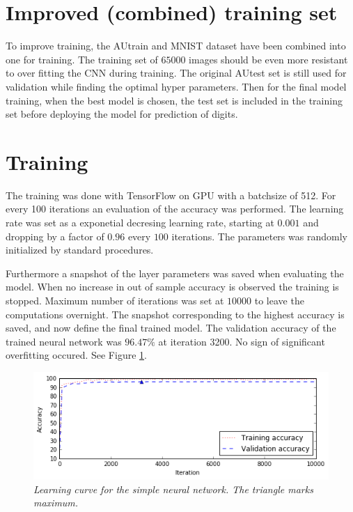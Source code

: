 \documentclass[a4paper,10pt,article,oneside,english]{memoir}
\let\oldcaption\caption
\renewcommand{\caption}[1]{\oldcaption{\emph{#1}}}
\begin{document}
	
	
	\section{Improved (combined) training set}
	To improve training, the AUtrain and MNIST dataset have been combined into one for training. The training set of $65000$ images should be even more resistant to over fitting the CNN during training. 
	The original AUtest set is still used for validation while finding the optimal hyper parameters. Then for the final model training, when the best model is chosen, the test set is included in the training set before deploying the model for prediction of digits.  
	
	
	\section{Training}
	The training was done with TensorFlow on GPU with a batchsize of 512. For every 100 iterations an evaluation of the accuracy was performed. 
	The learning rate was set as a exponetial decresing learning rate, starting at $0.001$ and dropping by a factor of $0.96$ every $100$ iterations. The parameters was randomly initialized by standard procedures.
	
	Furthermore a snapshot of the layer parameters was saved when evaluating the model. When no increase in out of sample accuracy is observed the training is stopped. Maximum number of iterations was set at $10000$ to leave the computations overnight. The snapshot corresponding to the highest accuracy is saved, and now define the final trained model. The validation accuracy of the trained neural network was $96.47\%$ at iteration 3200. No sign of significant overfitting occured. See Figure \ref{fig:nn_learning}. 
	
	\begin{figure}[h!]
		\centering
		\includegraphics[width=0.9\linewidth]{nn_learning.png}
		\caption{Learning curve for the simple neural network. The triangle marks maximum.}
		\label{fig:nn_learning}
	\end{figure}
	
\end{document}
